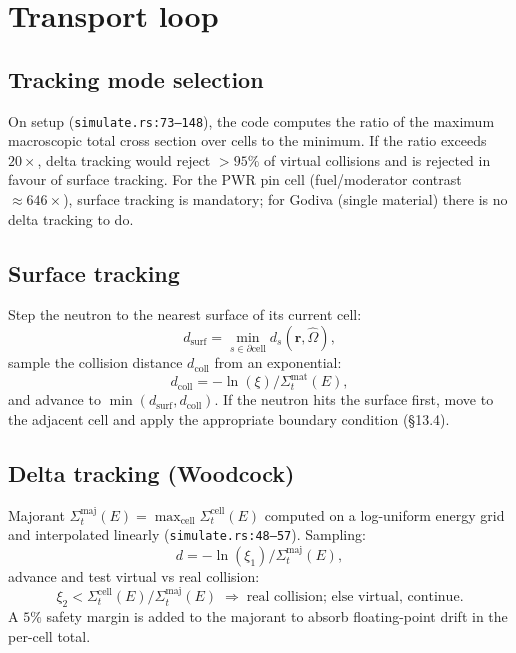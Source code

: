 \documentclass[11pt,a4paper]{article}
\begin{document}
\section{Transport loop}

\subsection{Tracking mode selection}

On setup (\texttt{simulate.rs:73--148}), the code computes the
ratio of the maximum macroscopic total cross section over cells
to the minimum. If the ratio exceeds $20\times$, delta tracking
would reject $>\!95\%$ of virtual collisions and is rejected
in favour of surface tracking. For the PWR pin cell
(fuel/moderator contrast $\approx\!646\times$), surface tracking
is mandatory; for Godiva (single material) there is no delta
tracking to do.

\subsection{Surface tracking}

Step the neutron to the nearest surface of its current cell:
\begin{equation}
d_\text{surf} = \min_{s \in \partial\text{cell}} d_s(\mathbf{r}, \hat{\Omega}),
\end{equation}
sample the collision distance $d_\text{coll}$ from an
exponential:
\begin{equation}
d_\text{coll} = -\ln(\xi) / \Sigma_t^\text{mat}(E),
\end{equation}
and advance to $\min(d_\text{surf}, d_\text{coll})$. If the
neutron hits the surface first, move to the adjacent cell and
apply the appropriate boundary condition (\S13.4).

\subsection{Delta tracking (Woodcock)}

Majorant $\Sigma_t^\text{maj}(E) = \max_\text{cell}
\Sigma_t^\text{cell}(E)$ computed on a log-uniform energy grid
and interpolated linearly (\texttt{simulate.rs:48--57}).
Sampling:
\begin{equation}
d = -\ln(\xi_1) / \Sigma_t^\text{maj}(E),
\end{equation}
advance and test virtual vs real collision:
\begin{equation}
\xi_2 < \Sigma_t^\text{cell}(E) / \Sigma_t^\text{maj}(E)
\;\Rightarrow\; \text{real collision; else virtual, continue}.
\end{equation}
A $5\%$ safety margin is added to the majorant to absorb
floating-point drift in the per-cell total.
\end{document}
